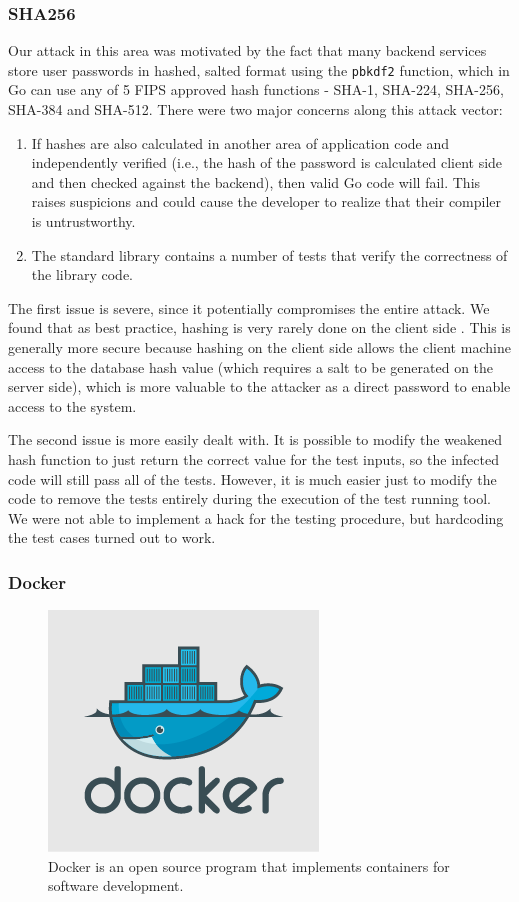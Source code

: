 \documentclass[10pt]{sigplanconf}
\begin{document}
\subsubsection{SHA256}
Our attack in this area was motivated by the fact that many backend services store user passwords in hashed, salted format using the \texttt{pbkdf2} function, which in Go can use any of 5 FIPS approved hash functions - SHA-1, SHA-224, SHA-256, SHA-384 and SHA-512. There were two major concerns along this attack vector:

\begin{enumerate}
	\item If hashes are also calculated in another area of application code and independently verified (i.e., the hash of the password is calculated client side and then checked against the backend), then valid Go code will fail. This raises suspicions and could cause the developer to realize that their compiler is untrustworthy.
	\item The standard library contains a number of tests that verify the correctness of the library code. 
\end{enumerate}

The first issue is severe, since it potentially compromises the entire attack. We found that as best practice, hashing is very rarely done on the client side \cite{clienthash}. This is generally more secure because hashing on the client side allows the client machine access to the database hash value (which requires a salt to be generated on the server side), which is more valuable to the attacker as a direct password to enable access to the system.

\smallskip
The second issue is more easily dealt with. It is possible to modify the weakened hash function to just return the correct value for the test inputs, so the infected code will still pass all of the tests. However, it is much easier just to modify the code to remove the tests entirely during the execution of the test running tool. We were not able to implement a hack for the testing procedure, but hardcoding the test cases turned out to work.

\subsubsection{Docker}

\begin{figure}[H]
\centering
\includegraphics[scale=0.25]{docker}
\caption{Docker is an open source program that implements containers for software development.}
\label{fig:docker}
\end{figure}
\end{document}
